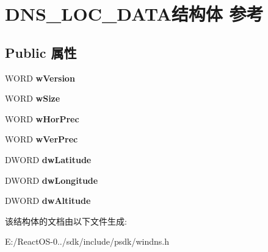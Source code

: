 \hypertarget{struct_d_n_s___l_o_c___d_a_t_a}{}\section{D\+N\+S\+\_\+\+L\+O\+C\+\_\+\+D\+A\+T\+A结构体 参考}
\label{struct_d_n_s___l_o_c___d_a_t_a}
\subsection*{Public 属性}
\begin{DoxyCompactItemize}
\item 
\mbox{\label{struct_d_n_s___l_o_c___d_a_t_a_a1a8172f42f1aa84367fa41b5017984d1}} 
W\+O\+RD {\bfseries w\+Version}
\item 
\mbox{\label{struct_d_n_s___l_o_c___d_a_t_a_a19c042726f7eaed16fe75a9efae3d7fb}} 
W\+O\+RD {\bfseries w\+Size}
\item 
\mbox{\label{struct_d_n_s___l_o_c___d_a_t_a_a8f15359b9e9866429c31f00e693ab2d1}} 
W\+O\+RD {\bfseries w\+Hor\+Prec}
\item 
\mbox{\label{struct_d_n_s___l_o_c___d_a_t_a_a618714ed776867be73edba7267c17540}} 
W\+O\+RD {\bfseries w\+Ver\+Prec}
\item 
\mbox{\label{struct_d_n_s___l_o_c___d_a_t_a_ad0676dfc9cea8415e2291c1b7aa206c5}} 
D\+W\+O\+RD {\bfseries dw\+Latitude}
\item 
\mbox{\label{struct_d_n_s___l_o_c___d_a_t_a_a9da65fce5398df5cfe8225946402f260}} 
D\+W\+O\+RD {\bfseries dw\+Longitude}
\item 
\mbox{\label{struct_d_n_s___l_o_c___d_a_t_a_ace75b6765c5930d1d44a44c231ea8ab7}} 
D\+W\+O\+RD {\bfseries dw\+Altitude}
\end{DoxyCompactItemize}


该结构体的文档由以下文件生成\+:\begin{DoxyCompactItemize}
\item 
E\+:/\+React\+O\+S-\/0../sdk/include/psdk/windns.\+h\end{DoxyCompactItemize}
